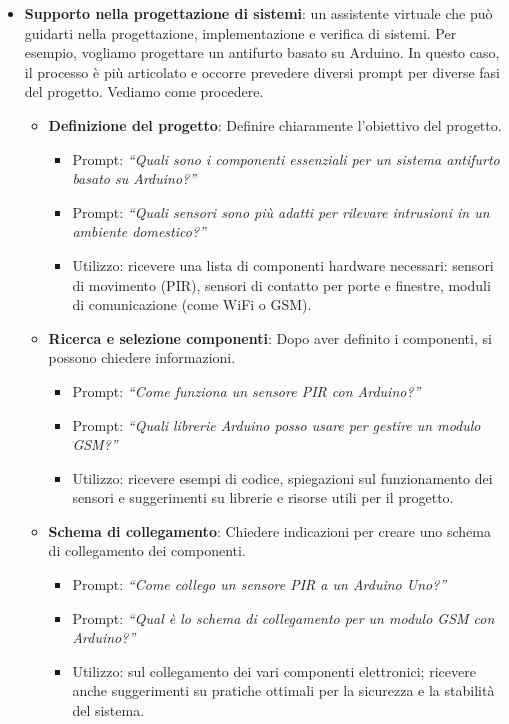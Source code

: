 \begin{itemize}
                \item \textbf{Supporto nella progettazione di sistemi}: un assistente virtuale che può guidarti nella progettazione, implementazione e verifica di sistemi. Per esempio, vogliamo progettare un antifurto basato su Arduino. In questo caso, il processo è più articolato e occorre prevedere diversi prompt per diverse fasi del progetto. Vediamo come procedere.
                \begin{itemize}
                    \item \textbf{Definizione del progetto}: Definire chiaramente l'obiettivo del progetto.
                    \begin{itemize}
                        \item Prompt: \textit{``Quali sono i componenti essenziali per un sistema antifurto basato su Arduino?''}
                        \item Prompt: \textit{``Quali sensori sono più adatti per rilevare intrusioni in un ambiente domestico?''}
                        \item Utilizzo: ricevere una lista di componenti hardware necessari: sensori di movimento (PIR), sensori di contatto per porte e finestre, moduli di comunicazione (come WiFi o GSM).
                    \end{itemize}
                    
                    \item \textbf{Ricerca e selezione componenti}: Dopo aver definito i componenti, si possono chiedere informazioni.
                    \begin{itemize}
                        \item Prompt: \textit{``Come funziona un sensore PIR con Arduino?''}
                        \item Prompt: \textit{``Quali librerie Arduino posso usare per gestire un modulo GSM?''}
                        \item Utilizzo: ricevere esempi di codice, spiegazioni sul funzionamento dei sensori e suggerimenti su librerie e risorse utili per il progetto.
                    \end{itemize}
                    
                    \item \textbf{Schema di collegamento}: Chiedere indicazioni per creare uno schema di collegamento dei componenti.
                    \begin{itemize}
                        \item Prompt: \textit{``Come collego un sensore PIR a un Arduino Uno?''}
                        \item Prompt: \textit{``Qual è lo schema di collegamento per un modulo GSM con Arduino?''}
                        \item Utilizzo: sul collegamento dei vari componenti elettronici; ricevere anche suggerimenti su pratiche ottimali per la sicurezza e la stabilità del sistema.
                    \end{itemize}
                    

\end{itemize}
\end{itemize}
